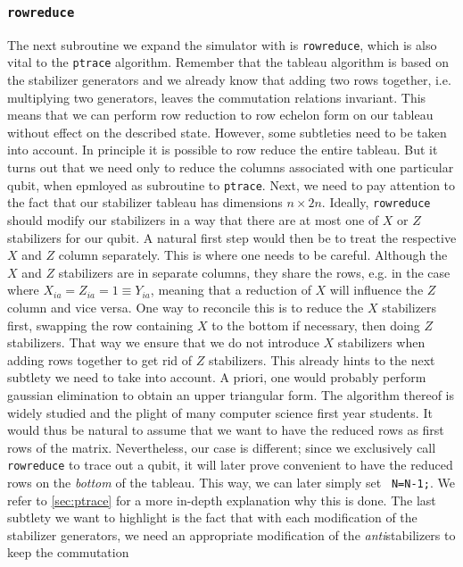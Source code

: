 \subsubsection{\texttt{rowreduce}}
The next subroutine we expand the simulator with is \texttt{rowreduce}, which
is also vital to the \verb|ptrace| algorithm. Remember that the tableau
algorithm is based on the stabilizer generators and we already know that adding
two rows together, i.e. multiplying two generators, leaves the commutation
relations invariant. This means that we can perform row reduction to row
echelon form on our tableau without effect on the described state. However,
some subtleties need to be taken into account. In principle it is possible to
row reduce the entire tableau. But it turns out that we need only to reduce the
columns associated with one particular qubit, when epmloyed as subroutine to
\verb|ptrace|. Next, we need to pay attention to the fact that our stabilizer
tableau has dimensions $n\times 2n$. Ideally, \verb|rowreduce| should modify
our stabilizers in a way that there are at most one of $X$ or $Z$ stabilizers
for our qubit. A natural first step would then be to treat the respective $X$
and $Z$ column separately. This is where one needs to be careful. Although the $X$
and $Z$ stabilizers are in separate columns, they share the rows, e.g. in the
case where $X_{ia}=Z_{ia}=1\equiv Y_{ia}$, meaning that
a reduction of $X$ will influence the $Z$ column and vice versa. One way to
reconcile this is to reduce the $X$ stabilizers first, swapping the row
containing $X$ to the bottom if necessary, then doing $Z$ stabilizers. That way
we ensure that we do not introduce $X$ stabilizers when adding rows together
to get rid of $Z$ stabilizers. This already hints to the next subtlety we need
to take into account. A priori, one would probably perform gaussian
elimination to obtain an upper triangular form. The algorithm thereof is widely
studied and the plight of many computer science first year students. It would
thus be natural to assume that we want to have the reduced rows as first rows
of the matrix. Nevertheless, our case is different; since we exclusively call
\verb|rowreduce| to trace out a qubit, it will later prove convenient to have
the reduced rows on the \emph{bottom} of the tableau. This way, we can later
simply set \verb| N=N-1;|. We refer to \cref{sec:ptrace} for a more in-depth
explanation why this is done. The last subtlety we want to highlight is the
fact that with each modification of the stabilizer generators, we need an
appropriate modification of the \emph{anti}stabilizers to keep the commutation
